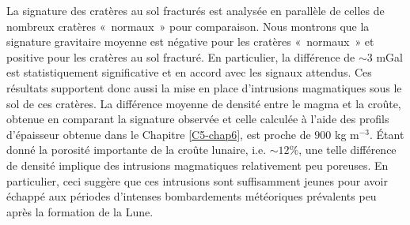 La signature des cratères au sol fracturés est analysée en parallèle
de celles de nombreux cratères « normaux » pour comparaison. Nous
montrons que la signature gravitaire moyenne est négative pour les
cratères « normaux » et positive pour les cratères au sol fracturé. En
particulier, la différence de $\sim 3$ mGal est statistiquement
significative et en accord avec les signaux attendus. Ces résultats
supportent donc aussi la mise en place d’intrusions magmatiques sous
le sol de ces cratères. La différence moyenne de densité entre le
magma et la croûte, obtenue en comparant la signature observée et
celle calculée à l’aide des profils d’épaisseur obtenue dans le
Chapitre \ref{C5-chap6}, est proche de $900$ kg m$^{-3}$. Étant donné
la porosité importante de la croûte lunaire, i.e. $\sim 12\%$, une
telle différence de densité implique des intrusions magmatiques
relativement peu poreuses. En particulier, ceci suggère que ces
intrusions sont suffisamment jeunes pour avoir échappé aux périodes
d’intenses bombardements météoriques prévalents peu après la formation
de la Lune.


